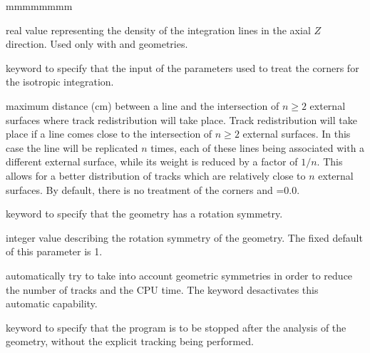 \begin{ListeDeDescription}{mmmmmmmm}
\item[\dusa{dens\_z}] real value representing the density of the integration
lines in the axial $Z$ direction. Used only with  and  geometries.

\item[\moc{CORN}] keyword to specify that the input of the parameters used to
treat the corners for the isotropic integration.

\item[\dusa{pcorn}] maximum distance (cm) between a line and the intersection
of $n\ge 2$ external surfaces where track redistribution will take place. Track
redistribution will take place if a line comes close to the intersection of
$n\ge 2$ external surfaces. In this case the line will be replicated $n$ times,
each of these lines being associated with a different external surface, while
its weight is reduced by a factor of $1/n$. This allows for a better
distribution of tracks which are relatively close to $n$ external surfaces. By
default, there is no treatment of the corners and =0.0.

\item[\moc{SYMM}] keyword to specify that the geometry has a rotation
symmetry.

\item[\dusa{isymm}] integer value describing the rotation symmetry of the
geometry. The fixed default of this parameter is 1.

\item[\moc{NOSY}]  automatically try to take into account
geometric symmetries in order to reduce the number of tracks and the CPU
time. The  keyword desactivates this automatic capability.

\item[\moc{HALT}] keyword to specify that the program is to be stopped after
the analysis of the geometry, without the explicit tracking being performed.

\end{ListeDeDescription}
\eject
